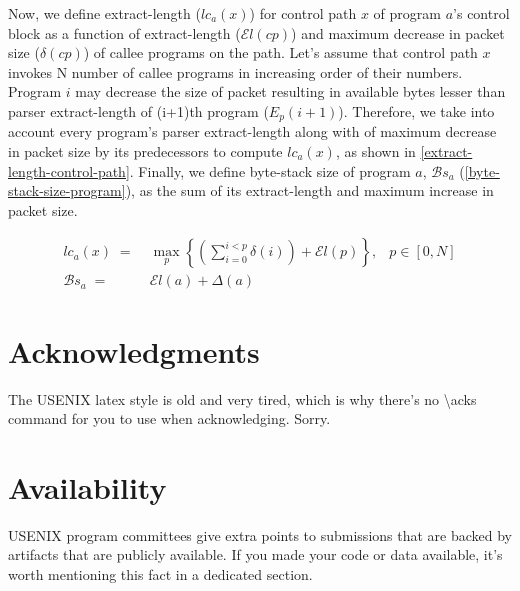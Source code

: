 Now, we define extract-length ($lc_{a}(x)$) for control path $x$ of program $a$'s control block as a function of extract-length ($\mathcal{E}l(cp)$) and maximum decrease in packet size ($\delta(cp)$) of callee programs on the path.
Let's assume that control path $x$ invokes N number of callee programs in increasing order of their numbers. 
Program $i$ may decrease the size of packet resulting in available bytes lesser than parser extract-length of (i+1)th program ($E_{p}(i+1)$).
Therefore, we take into account every program's parser extract-length along with of maximum decrease in packet size by its predecessors to compute $lc_{a}(x)$, as shown in \ref{extract-length-control-path}.
Finally, we define byte-stack size of program $a$, $\mathcal{B}s_{a}$ (\ref{byte-stack-size-program}), as the sum of its extract-length and maximum increase in packet size.

\begin{align}
lc_{a}(x) \; =& \; \max_{p} \left\{ \left( \sum_{i=0}^{i<p} \delta(i) \right)+ \mathcal{E}l(p) \right\},&p \in [0,N] \label{extract-length-control-path} \\
\mathcal{B}s_{a} \; =& \; \mathcal{E}l(a) + \Delta(a) & \label{byte-stack-size-program}
\end{align}



\section*{Acknowledgments}

The USENIX latex style is old and very tired, which is why
there's no \textbackslash{}acks command for you to use when
acknowledging. Sorry.

\section*{Availability}

USENIX program committees give extra points to submissions that are
backed by artifacts that are publicly available. If you made your code
or data available, it's worth mentioning this fact in a dedicated
section.






